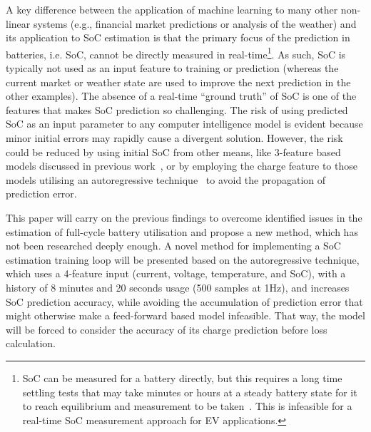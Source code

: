 %
%
A key difference between the application of machine learning to many other non-linear systems (e.g., financial market predictions or analysis of the weather) and its application to SoC estimation is that the primary focus of the prediction in batteries, i.e. SoC, cannot be directly measured in real-time\footnote{SoC can be measured for a battery directly, but this requires a long time settling tests that may take minutes or hours at a steady battery state for it to reach equilibrium and measurement to be taken~\cite{ali_towards_2019}. This is infeasible for a real-time SoC measurement approach for EV applications.}.
As such, SoC is typically not used as an input feature to training or prediction (whereas the current market or weather state are used to improve the next prediction in the other examples).
The absence of a real-time “ground truth” of SoC is one of the features that makes SoC prediction so challenging.
The risk of using predicted SoC as an input parameter to any computer intelligence model is evident because minor initial errors may rapidly cause a divergent solution.
However, the risk could be reduced by using initial SoC from other means, like 3-feature based models discussed in previous work~\cite{sadykov_practical_2022}, or by employing the charge feature to those models utilising an autoregressive technique~\cite{time_2020} to avoid the propagation of prediction error.

%
%
This paper will carry on the previous findings to overcome identified issues in the estimation of full-cycle battery utilisation and propose a new method, which has not been researched deeply enough.
A novel method for implementing a SoC estimation training loop will be presented based on the autoregressive technique, which uses a 4-feature input (current, voltage, temperature, and SoC), with a history of 8 minutes and 20 seconds usage (500 samples at 1Hz), and increases SoC prediction accuracy, while avoiding the accumulation of prediction error that might otherwise make a feed-forward based model infeasible.
That way, the model will be forced to consider the accuracy of its charge prediction before loss calculation.

